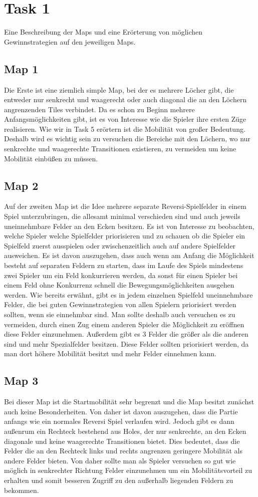 \section{Task 1}
Eine Beschreibung der Maps und eine Erörterung von möglichen Gewinnstrategien auf den jeweiligen Maps.
\subsection{Map 1}
Die Erste ist eine ziemlich simple Map, bei der es mehrere Löcher gibt, die entweder nur senkrecht und waagerecht oder auch diagonal die an den Löchern angrenzenden Tiles verbindet. 
Da es schon zu Beginn mehrere Anfangsmöglichkeiten gibt, ist es von Interesse wie die Spieler ihre ersten Züge realisieren. 
Wie wir in Task 5 erörtern ist die Mobilität von großer Bedeutung. Deshalb wird es wichtig sein zu versuchen die Bereiche mit den Löchern, wo nur senkrechte und waagerechte Transitionen existieren, zu vermeiden um keine Mobilität einbüßen zu müssen.
\subsection{Map 2}
Auf der zweiten Map ist die Idee mehrere separate Reversi-Spielfelder in einem Spiel unterzubringen, die allesamt minimal verschieden sind und auch jeweils uneinnehmbare Felder an den Ecken besitzen.
Es ist von Interesse zu beobachten, welche Spieler welche Spielfelder priorisieren und zu schauen ob die Spieler ein Spielfeld zuerst ausspielen oder zwischenzeitlich auch auf andere Spielfelder ausweichen.
Es ist davon auszugehen, dass auch wenn am Anfang die Möglichkeit besteht auf separaten Feldern zu starten, dass im Laufe des Spiels mindestens zwei Spieler um ein Feld konkurrieren werden, da sonst für einen Spieler bei einem Feld ohne Konkurrenz schnell die Bewegungsmöglichkeiten ausgehen werden.
Wie bereits erwähnt, gibt es in jedem einzelnen Spielfeld uneinnehmbare Felder, die bei guten Gewinnstrategien von allen Spielern priorisiert werden sollten, wenn sie einnehmbar sind. 
Man sollte deshalb auch versuchen es zu vermeiden, durch einen Zug einem anderen Spieler die Möglichkeit zu eröffnen diese Felder einzunehmen.
Außerdem gibt es 3 Felder die größer als die anderen sind und mehr Spezialfelder besitzen. Diese Felder sollten priorisiert werden, da man dort höhere Mobilität besitzt und mehr Felder einnehmen kann.
\subsection{Map 3}
Bei dieser Map ist die Startmobilität sehr begrenzt und die Map besitzt zunächst auch keine Besonderheiten. Von daher ist davon auszugehen, dass die Partie anfangs wie ein normales Reversi Spiel verlaufen wird.
Jedoch gibt es dann außenrum ein Rechteck bestehend aus Holes, der nur senkrechte, an den Ecken diagonale und keine waagerechte Transitionen bietet. Dies bedeutet, dass die Felder die an den Rechteck links und rechts angrenzen geringere Mobilität als andere Felder bieten.
Von daher sollte man als Spieler versuchen so gut wie möglich in senkrechter Richtung Felder einzunehmen um ein Mobilitätsvorteil zu erhalten und somit besseren Zugriff zu den außerhalb liegenden Feldern zu bekommen.